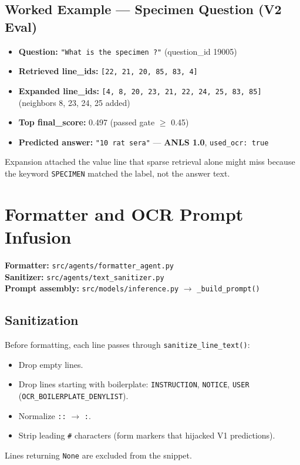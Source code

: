 \documentclass[11pt,a4paper]{article}
\begin{document}
\subsection{Worked Example --- Specimen Question (V2 Eval)}
\begin{itemize}
    \item \textbf{Question:} \texttt{"What is the specimen ?"} (question\_id 19005)
    \item \textbf{Retrieved line\_ids:} \texttt{[22, 21, 20, 85, 83, 4]}
    \item \textbf{Expanded line\_ids:} \texttt{[4, 8, 20, 23, 21, 22, 24, 25, 83, 85]} (neighbors 8, 23, 24, 25 added)
    \item \textbf{Top final\_score:} 0.497 (passed gate $\ge$ 0.45)
    \item \textbf{Predicted answer:} \texttt{"10 rat sera"} --- \textbf{ANLS 1.0}, \texttt{used\_ocr: true}
\end{itemize}
Expansion attached the value line that sparse retrieval alone might miss because the keyword \texttt{SPECIMEN} matched the label, not the answer text.

\newpage
\section{Formatter and OCR Prompt Infusion}
\textbf{Formatter:} \texttt{src/agents/formatter\_agent.py} \\
\textbf{Sanitizer:} \texttt{src/agents/text\_sanitizer.py} \\
\textbf{Prompt assembly:} \texttt{src/models/inference.py} $\rightarrow$ \texttt{\_build\_prompt()}

\subsection{Sanitization}
Before formatting, each line passes through \texttt{sanitize\_line\_text()}:
\begin{itemize}
    \item Drop empty lines.
    \item Drop lines starting with boilerplate: \texttt{INSTRUCTION}, \texttt{NOTICE}, \texttt{USER} (\texttt{OCR\_BOILERPLATE\_DENYLIST}).
    \item Normalize \texttt{::} $\rightarrow$ \texttt{:}.
    \item Strip leading \texttt{\#} characters (form markers that hijacked V1 predictions).
\end{itemize}
Lines returning \texttt{None} are excluded from the snippet.
\end{document}
